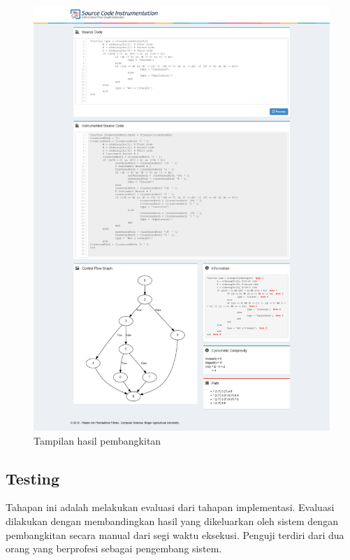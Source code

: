 \begin{figure}
	\centering
	\includegraphics[width=0.9\linewidth]{gambar/implementasiantarmuka}
	\caption{Tampilan hasil pembangkitan}
	\label{fig:implementasiantarmuka}
\end{figure}

\subsection*{Testing}

Tahapan ini adalah melakukan evaluasi dari tahapan implementasi. Evaluasi dilakukan dengan membandingkan hasil yang dikeluarkan oleh sistem dengan pembangkitan secara manual dari segi waktu eksekusi. Penguji terdiri dari dua orang yang berprofesi sebagai pengembang sistem. 

